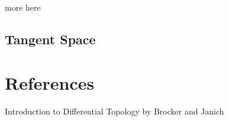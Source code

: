 \begin{insight}
   more here 
\end{insight}

















\section{Tangent Space}
\label{sec:tangent_space}


    

\appendix
\chapter{References}
\begin{enumerate*}
    \item Introduction to Differential Topology by Brocker and Janich
\end{enumerate*}

    




